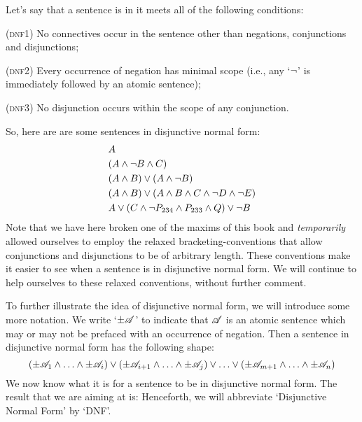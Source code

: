 Let's say that a sentence is in  \emph{\ifeff} it meets all of the following conditions:
	\begin{compactlist}
		\item[(\textsc{dnf1})] No connectives occur in the sentence other than negations, conjunctions and disjunctions;
		\item[(\textsc{dnf2})] Every occurrence of negation has minimal scope (i.e., any `$\neg$' is immediately followed by an atomic sentence);
		\item[(\textsc{dnf3})] No disjunction occurs within the scope of any conjunction.
	\end{compactlist}
So, here are are some sentences in disjunctive normal form:
\begin{align*}
  & A \\
  & (A \wedge \lnot B \wedge C)\\
  & (A \wedge B) \vee (A \wedge \neg B)\\
  & (A \wedge B) \vee (A \wedge  B \wedge C \wedge \neg D \wedge \neg E)\\
  & A \vee (C \wedge \neg P_{234} \wedge P_{233} \wedge Q) \vee \neg B
\end{align*}
Note that we have here broken one of the maxims of this book and \emph{temporarily} allowed ourselves to employ the relaxed bracketing-conventions that allow conjunctions and disjunctions to be of arbitrary length. These conventions make it easier to see when a sentence is in disjunctive normal form. We will continue to help ourselves to these relaxed conventions, without further comment.

To further illustrate the idea of disjunctive normal form, we will introduce some more notation. We write `$\pm\mathscr{A}$' to indicate that $\mathscr{A}$ is an atomic sentence which may or may not be prefaced with an occurrence of negation. Then a sentence in disjunctive normal form has the following shape:
	$$(\pm \mathscr{A}_1 \land \ldots \land \pm \mathscr{A}_i) \lor (\pm \mathscr{A}_{i+1} \land \ldots \land \pm\mathscr{A}_j) \lor \ldots \lor (\pm\mathscr{A}_{m+1} \land \ldots \land \pm \mathscr{A}_n)$$
We now know what it is for a sentence to be in disjunctive normal form. The result that we are aiming at is:
Henceforth, we will abbreviate `Disjunctive Normal Form' by `DNF'.


